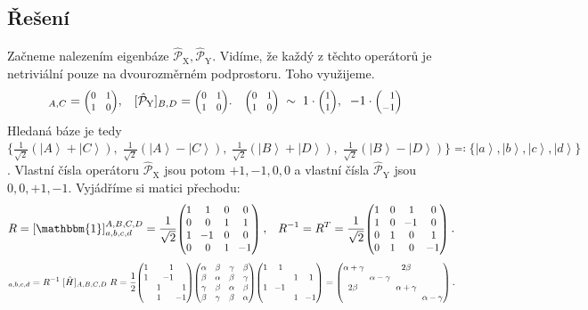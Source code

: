 \documentclass{article}
\def\ph{\phantom}
\def\lzw{\mathllap}
\newcommand{\const}[1]{\text{#1}}
\newcommand{\ket}[1]{\left| #1 \right>}
\newcommand{\Parity}{\hat{\mathcal{P}}}
\newcommand{\mat}[1]{
    \begin{pmatrix}
        #1
    \end{pmatrix}
}
\newcommand{\smat}[2][1]{
    \scalebox{#1}{$\mat{#2}$}
}
\begin{document}
\subsection*{Řešení}
Začneme nalezením eigenbáze $\Parity_\const{X}, \Parity_\const{Y}$. Vidíme, že každý z těchto operátorů je netriviální pouze na dvourozměrném podprostoru. Toho využijeme.
\begin{align*}
    [\Parity_\const{X}]_{A,C} &= \smat[0.8]{0 & 1 \\ 1 & 0}, &
    [\Parity_\const{Y}]_{B,D} &= \smat[0.8]{0 & 1 \\ 1 & 0}. &
    \smat[0.8]{0 & 1 \\ 1 & 0} \; &\sim \;
    1 \cdot \smat[0.8]{1 \\ 1}, \;\; -1 \cdot \smat[0.8]{\ph{-}1 \\ -1}
\end{align*}
Hledaná báze je tedy $\big\{ \frac{1}{\sqrt{2}}( \ket{A}+\ket{C} ), \; \frac{1}{\sqrt{2}}( \ket{A}-\ket{C} ), \; \frac{1}{\sqrt{2}}( \ket{B}+\ket{D} ), \; \frac{1}{\sqrt{2}}( \ket{B}-\ket{D} ) \big\} \eqqcolon \big\{ \ket{a}, \ket{b}, \ket{c}, \ket{d} \big\}$. Vlastní čísla operátoru $\Parity_\const{X}$ jsou potom $+1, -1, 0, 0$ a vlastní čísla $\Parity_\const{Y}$ jsou $0, 0, +1, -1$. Vyjádříme si matici přechodu:
\begin{align*}
    R &= [\mathbbm{1}]^{A,B,C,D}_{a,b,c,d} =
    \frac{1}{\sqrt{2}}
    \smat[0.9]{
        1 & 1 & 0 & 0 \\
        0 & 0 & 1 & 1 \\
        1 &\!-1 & 0 & 0 \\
        0 & 0 & 1 &\!-1
    } \: ,
    &
    R^{-1} = R^T =
    \frac{1}{\sqrt{2}}
    \smat[0.9]{
        1 & 0 & 1 & 0 \\
        1 & 0 &\!-1 & 0 \\
        0 & 1 & 0 & 1 \\
        0 & 1 & 0 &\!-1
    } \: .
\end{align*}
\begin{align*}
    [\hat H]_{a,b,c,d} = R^{-1} \; [\hat H]_{A,B,C,D} \; R
    =
    \frac{1}{2}
    \smat[0.9]{
        1 &   & 1 &   \\
        1 &   &\lzw{-}1 & \\
          & 1 &   & 1 \\
          & 1 &   &\lzw{-}1
    }
    \smat[0.9]{
        \alpha & \beta & \gamma & \beta \\
        \beta & \alpha & \beta & \gamma \\
        \gamma & \beta & \alpha & \beta \\
        \beta & \gamma & \beta & \alpha
    }
    \smat[0.9]{
        1 & 1 &   &   \\
          &   & 1 & 1 \\
        1 &\!-1 &   & \\
          &   & 1 &\!-1
    }
    =
    \smat[0.9]{
        \alpha + \gamma \! & & 2\beta \\
        & \! \alpha - \gamma \! \\
        2\beta & & \! \alpha + \gamma \! \\
        & & & \! \alpha - \gamma
    } \: .
\end{align*}
\end{document}
